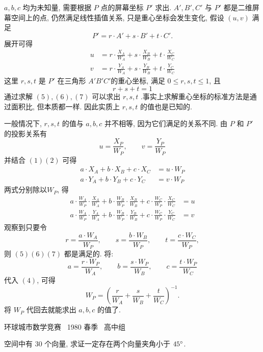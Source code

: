 $a,b,c$ 均为未知量, 需要根据 $P$ 点的屏幕坐标 $P'$ 求出. $A',B',C'$ 与 $P'$ 都是二维屏幕空间上的点, 仍然满足线性插值关系, 只是重心坐标会发生变化, 假设 $(u,v)$ 满足
\[P' = r\cdot A' + s\cdot B' + t\cdot C'.\]
展开可得
\begin{align*}
u &= r\cdot\frac{X_A}{W_A} + s\cdot\frac{X_B}{W_B} + t\cdot\frac{X_C}{W_C} \tag{5}\\
v &= r\cdot\frac{Y_A}{W_A} + s\cdot\frac{Y_B}{W_B} + t\cdot\frac{Y_C}{W_C} \tag{6}
\end{align*}
这里 $r,s,t$ 是 $P'$ 在三角形 $A'B'C'$的重心坐标, 满足 $0\le r,s,t\le 1$, 且
\[r+s+t=1 \tag{7} \]
通过求解 $(5),(6),(7)$ 可以求出 $r,s,t$ .事实上求解重心坐标的标准方法是通过面积比, 但本质都一样. 因此实质上 $r,s,t$ 的值也是已知的.

一般情况下, $r,s,t$ 的值与 $a,b,c$ 并不相等, 因为它们满足的关系不同. 由 $P$ 和 $P'$ 的投影关系有
$$u=\dfrac{X_P}{W_P},\qquad v=\dfrac{Y_P}{W_P}$$ 并结合 $(1)(2)$ 可得
\begin{align*}
a\cdot X_A + b\cdot X_B + c\cdot X_C &= u\cdot W_P\\
a\cdot Y_A + b\cdot Y_B + c\cdot Y_C &= v\cdot W_P 
\end{align*}
两式分别除以$W_P$, 得
\begin{align*}
a\cdot\frac{W_A}{W_P}\cdot \frac{X_A}{W_A} + b\cdot\frac{W_B}{W_P}\cdot \frac{X_B}{W_B}+ c\cdot\frac{W_C}{W_P}\cdot \frac{X_C}{W_C} &= u \\
a\cdot\frac{W_A}{W_P}\cdot \frac{Y_A}{W_A} + b\cdot\frac{W_B}{W_P}\cdot \frac{Y_B}{W_B}+ c\cdot\frac{W_C}{W_P}\cdot \frac{Y_C}{W_C} &= v 
\end{align*}
观察到只要令 
$$r = \frac{a\cdot W_A}{W_P}, \qquad s = \frac{b\cdot W_B}{W_P},\qquad t = \frac{c\cdot W_C}{W_P}, $$
则 $(5)(6)(7)$ 都是满足的. 将:
\[ a = \frac{r\cdot W_P}{W_A}, \qquad b = \frac{s\cdot W_P}{W_B}, \qquad c = \frac{t\cdot W_P}{W_C} \]
代入 $(4)$, 可得
\[W_P = \left( \frac{r}{W_A}+ \frac{s}{W_B} + \frac{t}{W_C} \right)^{-1} .\]
将 $W_P$ 代回去就能求出 $a,b,c$ 的值了.


\newpage

\noindent 环球城市数学竞赛~ 1980 春季~ 高中组

空间中有 30 个向量, 求证一定存在两个向量夹角小于 $ 45 \degree $.

